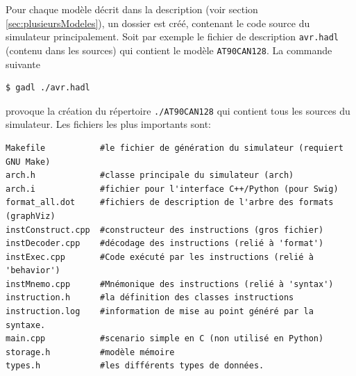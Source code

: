Pour chaque modèle décrit dans la description (voir section \ref{sec:plusieursModeles}), un dossier est créé, contenant le code source du simulateur principalement. Soit par exemple le fichier de description \texttt{avr.hadl} (contenu dans les sources) qui contient le modèle \texttt{AT90CAN128}. La commande suivante
\begin{verbatim}
$ gadl ./avr.hadl
\end{verbatim}
provoque la création du répertoire \texttt{./AT90CAN128} qui contient tous les sources du simulateur. Les fichiers les plus importants sont:
\begin{verbatim}
Makefile           #le fichier de génération du simulateur (requiert GNU Make)
arch.h             #classe principale du simulateur (arch)
arch.i             #fichier pour l'interface C++/Python (pour Swig)
format_all.dot     #fichiers de description de l'arbre des formats (graphViz)
instConstruct.cpp  #constructeur des instructions (gros fichier)
instDecoder.cpp    #décodage des instructions (relié à 'format')
instExec.cpp       #Code exécuté par les instructions (relié à 'behavior')
instMnemo.cpp      #Mnémonique des instructions (relié à 'syntax')
instruction.h      #la définition des classes instructions
instruction.log    #information de mise au point généré par la syntaxe.
main.cpp           #scenario simple en C (non utilisé en Python)
storage.h          #modèle mémoire
types.h            #les différents types de données.
\end{verbatim}
